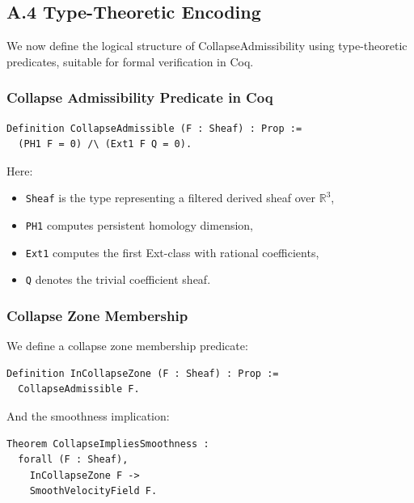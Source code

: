 \documentclass[11pt]{article}
\begin{document}
\subsection{A.4 Type-Theoretic Encoding}

We now define the logical structure of CollapseAdmissibility using type-theoretic predicates, suitable for formal verification in Coq.

\subsubsection{Collapse Admissibility Predicate in Coq}

\begin{lstlisting}[language=Coq, caption=CollapseAdmissibility Predicate in Coq]
Definition CollapseAdmissible (F : Sheaf) : Prop :=
  (PH1 F = 0) /\ (Ext1 F Q = 0).
\end{lstlisting}

\noindent
Here:
\begin{itemize}
  \item \texttt{Sheaf} is the type representing a filtered derived sheaf over \( \mathbb{R}^3 \),
  \item \texttt{PH1} computes persistent homology dimension,
  \item \texttt{Ext1} computes the first Ext-class with rational coefficients,
  \item \texttt{Q} denotes the trivial coefficient sheaf.
\end{itemize}

\subsubsection{Collapse Zone Membership}

We define a collapse zone membership predicate:

\begin{lstlisting}[language=Coq, caption=Collapse Zone Predicate]
Definition InCollapseZone (F : Sheaf) : Prop :=
  CollapseAdmissible F.
\end{lstlisting}

\noindent
And the smoothness implication:

\begin{lstlisting}[language=Coq, caption=CollapseImpliesSmoothness]
Theorem CollapseImpliesSmoothness :
  forall (F : Sheaf),
    InCollapseZone F ->
    SmoothVelocityField F.
\end{lstlisting}
\end{document}
